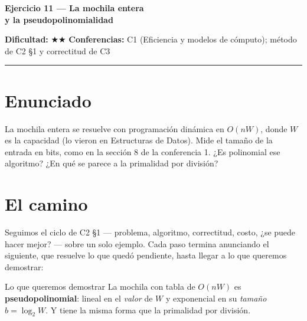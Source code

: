 \documentclass[11pt]{article}
\begin{document}
{\LARGE\bfseries\color{azultitulo} Ejercicio 11 --- La mochila entera\\ y la pseudopolinomialidad}

\vspace{2pt}
\textbf{Dificultad:} $\bigstar\bigstar$ \quad \textbf{Conferencias:} C1 (Eficiencia y modelos de cómputo);
método de C2 §1 y correctitud de C3
\vspace{8pt}
\hrule
\vspace{12pt}

\section*{Enunciado}
\begin{enunciado}
La mochila entera se resuelve con programación dinámica en $O(nW)$, donde $W$ es la capacidad (lo vieron
en Estructuras de Datos). Mide el tamaño de la entrada en bits, como en la sección 8 de la conferencia 1.
¿Es polinomial ese algoritmo? ¿En qué se parece a la primalidad por división?
\end{enunciado}

\section*{El camino}

Seguimos el ciclo de C2 §1 --- problema, algoritmo, correctitud, costo, ¿se puede hacer mejor? --- sobre un
solo ejemplo. Cada paso termina anunciando el siguiente, que resuelve lo que quedó pendiente, hasta llegar a lo que
queremos demostrar:

\begin{resultado}{Lo que queremos demostrar}
La mochila con tabla de $O(nW)$ es \textbf{pseudopolinomial}: lineal en el \emph{valor} de $W$ y exponencial
en su \emph{tamaño} $b=\log_2W$. Y tiene la misma forma que la primalidad por división.
\end{resultado}
\end{document}
